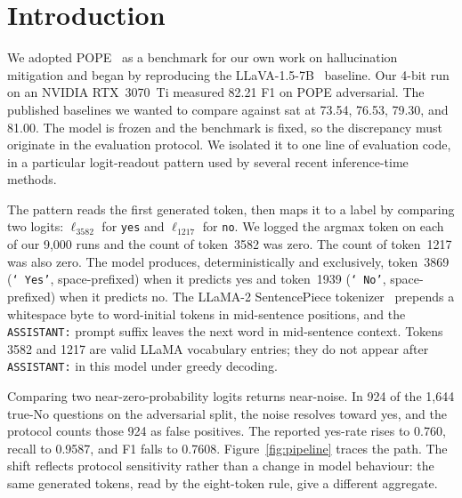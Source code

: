 \documentclass[11pt,letterpaper]{article}
\begin{document}
\section{Introduction}
\label{sec:intro}

We adopted POPE~\citep{li2023evaluating} as a benchmark for our own work
on hallucination mitigation and began by reproducing the
LLaVA-1.5-7B~\citep{liu2023improved} baseline. Our 4-bit run on an
NVIDIA RTX~3070~Ti measured 82.21 F1 on POPE adversarial. The published
baselines we wanted to compare against sat at 73.54, 76.53, 79.30, and
81.00. The model is frozen and the benchmark is fixed, so the
discrepancy must originate in the evaluation protocol. We isolated it
to one line of evaluation code, in a particular logit-readout pattern
used by several recent inference-time methods.

The pattern reads the first generated token, then maps it to a label
by comparing two logits: $\ell_{3582}$ for \texttt{yes} and
$\ell_{1217}$ for \texttt{no}. We logged the argmax token on each of
our 9{,}000 runs and the count of token~3582 was zero. The count of
token~1217 was also zero. The model produces, deterministically and
exclusively, token~3869 (\texttt{`\,Yes'}, space-prefixed) when it
predicts yes and token~1939 (\texttt{`\,No'}, space-prefixed) when it
predicts no. The LLaMA-2 SentencePiece
tokenizer~\citep{kudo2018sentencepiece,touvron2023llama2} prepends a
whitespace byte to word-initial tokens in mid-sentence positions, and
the \texttt{ASSISTANT:} prompt suffix leaves the next word in
mid-sentence context. Tokens 3582 and 1217 are valid LLaMA vocabulary
entries; they do not appear after \texttt{ASSISTANT:} in this model
under greedy decoding.

Comparing two near-zero-probability logits returns near-noise. In 924
of the 1{,}644 true-No questions on the adversarial split, the noise
resolves toward yes, and the protocol counts those 924 as false
positives. The reported yes-rate rises to 0.760, recall to 0.9587,
and F1 falls to 0.7608. Figure~\ref{fig:pipeline} traces the path.
The shift reflects protocol sensitivity rather than a change in model
behaviour: the same generated tokens, read by the eight-token rule,
give a different aggregate.
\end{document}
